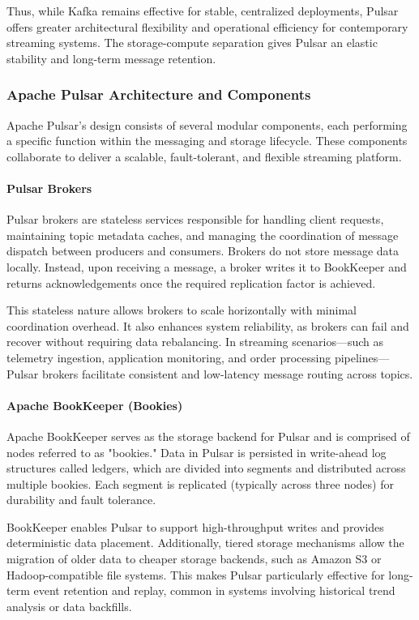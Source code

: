 Thus, while Kafka remains effective for stable, centralized deployments, Pulsar offers greater architectural flexibility and operational efficiency for contemporary streaming systems. The storage-compute separation gives Pulsar an elastic stability and long-term message retention.

\subsubsection{Apache Pulsar Architecture and Components}
Apache Pulsar's design consists of several modular components, each performing a specific function within the messaging and storage lifecycle. These components collaborate to deliver a scalable, fault-tolerant, and flexible streaming platform.

\paragraph{Pulsar Brokers}
Pulsar brokers are stateless services responsible for handling client requests, maintaining topic metadata caches, and managing the coordination of message dispatch between producers and consumers. Brokers do not store message data locally. Instead, upon receiving a message, a broker writes it to BookKeeper and returns acknowledgements once the required replication factor is achieved.

This stateless nature allows brokers to scale horizontally with minimal coordination overhead. It also enhances system reliability, as brokers can fail and recover without requiring data rebalancing. In streaming scenarios—such as telemetry ingestion, application monitoring, and order processing pipelines—Pulsar brokers facilitate consistent and low-latency message routing across topics.

\paragraph{Apache BookKeeper (Bookies)}
Apache BookKeeper serves as the storage backend for Pulsar and is comprised of nodes referred to as "bookies." Data in Pulsar is persisted in write-ahead log structures called ledgers, which are divided into segments and distributed across multiple bookies. Each segment is replicated (typically across three nodes) for durability and fault tolerance.

BookKeeper enables Pulsar to support high-throughput writes and provides deterministic data placement. Additionally, tiered storage mechanisms allow the migration of older data to cheaper storage backends, such as Amazon S3 or Hadoop-compatible file systems. This makes Pulsar particularly effective for long-term event retention and replay, common in systems involving historical trend analysis or data backfills.


